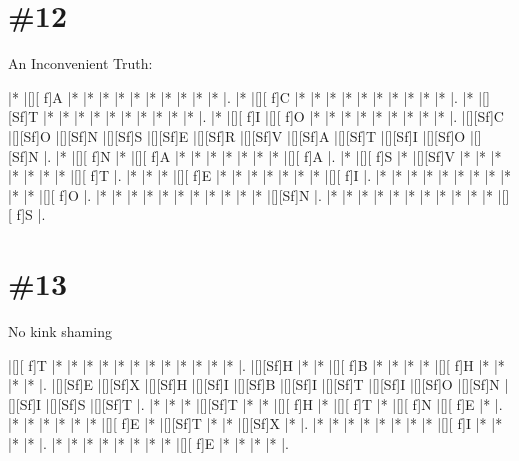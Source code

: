 \documentclass[letterpaper]{article}
\begin{document}
\section*{\#12}

An Inconvenient Truth:
\vspace*{1em}
\begin{Puzzle}{12}{11}
|*        |[][ f]A  |*        |*        |*        |*        |*        |*        |*        |*        |*        |*        |. 
|*        |[][ f]C  |*        |*        |*        |*        |*        |*        |*        |*        |*        |*        |.  
|*        |[][Sf]T  |*        |*        |*        |*        |*        |*        |*        |*        |*        |*        |.
|*        |[][ f]I  |[][ f]O  |*        |*        |*        |*        |*        |*        |*        |*        |*        |.  
|[][Sf]C  |[][Sf]O  |[][Sf]N  |[][Sf]S  |[][Sf]E  |[][Sf]R  |[][Sf]V  |[][Sf]A  |[][Sf]T  |[][Sf]I  |[][Sf]O  |[][Sf]N  |.
|*        |[][ f]N  |*        |[][ f]A  |*        |*        |*        |*        |*        |*        |*        |[][ f]A  |. 
|*        |[][ f]S  |*        |[][Sf]V  |*        |*        |*        |*        |*        |*        |*        |[][ f]T  |.
|*        |*        |*        |[][ f]E  |*        |*        |*        |*        |*        |*        |*        |[][ f]I  |.
|*        |*        |*        |*        |*        |*        |*        |*        |*        |*        |*        |[][ f]O  |.
|*        |*        |*        |*        |*        |*        |*        |*        |*        |*        |*        |[][Sf]N  |.
|*        |*        |*        |*        |*        |*        |*        |*        |*        |*        |*        |[][ f]S  |.
\end{Puzzle}

\section*{\#13}
No kink shaming

\vspace*{1em}
\begin{Puzzle}{13}{7}
|[][ f]T  |*        |*        |*        |*        |*        |*        |*        |*        |*        |*        |*        |*        |.
|[][Sf]H  |*        |*        |[][ f]B  |*        |*        |*        |*        |[][ f]H  |*        |*        |*        |*        |.
|[][Sf]E  |[][Sf]X  |[][Sf]H  |[][Sf]I  |[][Sf]B  |[][Sf]I  |[][Sf]T  |[][Sf]I  |[][Sf]O  |[][Sf]N  |[][Sf]I  |[][Sf]S  |[][Sf]T  |.
|*        |*        |*        |[][Sf]T  |*        |*        |[][ f]H  |*        |[][ f]T  |*        |[][ f]N  |[][ f]E  |*        |.
|*        |*        |*        |*        |*        |*        |[][ f]E  |*        |[][Sf]T  |*        |*        |[][Sf]X  |*        |.
|*        |*        |*        |*        |*        |*        |*        |*        |[][ f]I  |*        |*        |*        |*        |.
|*        |*        |*        |*        |*        |*        |*        |*        |[][ f]E  |*        |*        |*        |*        |.
\end{Puzzle}
\end{document}
